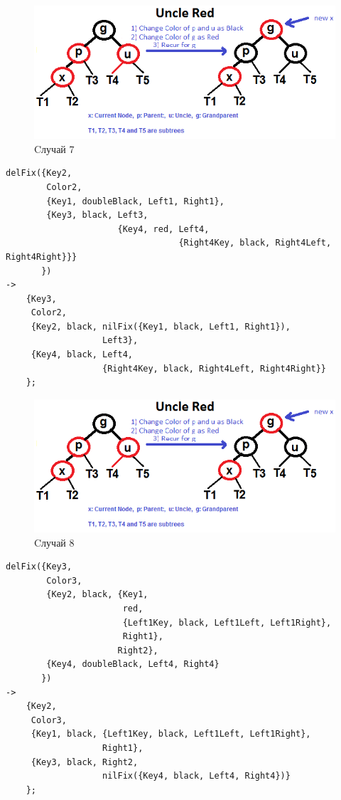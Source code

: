 			\begin{figure}[H]
				\centering
				\includegraphics[width=\textwidth]{img/tan-aus.png}
				\caption{Cлучай 7}
			\end{figure}
			\begin{lstlisting}
delFix({Key2,																		
		Color2,																		
		{Key1, doubleBlack, Left1, Right1},											
		{Key3, black, Left3,														
					  {Key4, red, Left4, 											
					 			  {Right4Key, black, Right4Left, Right4Right}}}		
	   })																			
->																					
	{Key3,																			
	 Color2,																		
	 {Key2, black, nilFix({Key1, black, Left1, Right1}),							
	               Left3},															
	 {Key4, black, Left4,															
				   {Right4Key, black, Right4Left, Right4Right}}						
	};																				
			\end{lstlisting}
			
			\begin{figure}[H]
				\centering
				\includegraphics[width=\textwidth]{img/tan-aus.png}
				\caption{Cлучай 8}
			\end{figure}
			\begin{lstlisting}
delFix({Key3,																		
		Color3,																		
		{Key2, black, {Key1, 														
					   red, 														
					   {Left1Key, black, Left1Left, Left1Right},					
					   Right1}, 													
					  Right2},														
		{Key4, doubleBlack, Left4, Right4}											
	   })																			
->																					
	{Key2,																			
	 Color3,																		
	 {Key1, black, {Left1Key, black, Left1Left, Left1Right},						
	 			   Right1},															
	 {Key3, black, Right2,															
	 			   nilFix({Key4, black, Left4, Right4})}							
	};																				
			\end{lstlisting}
			
